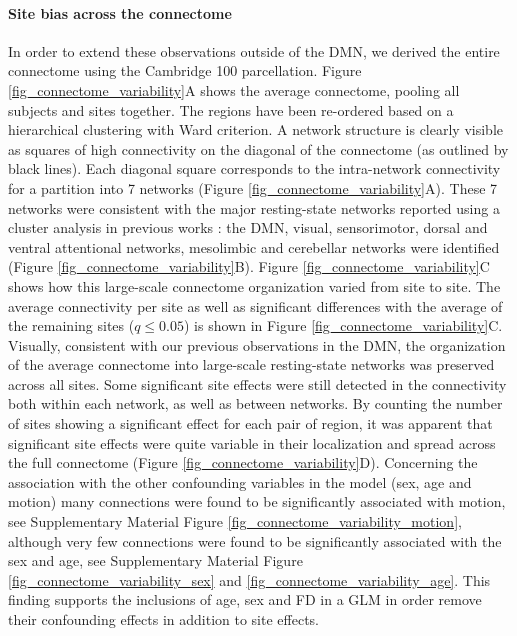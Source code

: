 \documentclass[authoryear]{elsarticle}
\begin{document}
\paragraph{Site bias across the connectome} In order to extend these
observations outside of the DMN, we derived the entire connectome using the
Cambridge 100 parcellation. Figure \ref{fig_connectome_variability}A shows the
average connectome, pooling all subjects and sites together. The regions have
been re-ordered based on a hierarchical clustering with Ward criterion. A
network structure is clearly visible as squares of high connectivity on the
diagonal of the connectome (as outlined by black lines). Each diagonal square
corresponds to the intra-network connectivity for a partition into 7 networks (Figure \ref{fig_connectome_variability}A). These 7 networks were
consistent with the major resting-state networks reported using a cluster
analysis in previous works \citep[e.g.][]{Heuvel2008, Bellec2010, Yeo2011,
Power2011}: the DMN, visual, sensorimotor, dorsal and ventral attentional
networks, mesolimbic and cerebellar networks were
identified (Figure \ref{fig_connectome_variability}B). Figure \ref{fig_connectome_variability}C shows how this large-scale
connectome organization varied from site to site. The average connectivity per
site as well as significant differences with the average of the remaining sites
($q\leq 0.05$) is shown in Figure \ref{fig_connectome_variability}C.
Visually, consistent with our previous observations in the DMN, the organization
of the average connectome into large-scale resting-state networks was preserved
across all sites. 
Some significant site effects were still detected in the connectivity both within each network, as well as between networks. By counting the number of sites showing a significant effect for each pair of region, it was apparent that significant site effects were quite variable in their localization and spread across the full connectome (Figure \ref{fig_connectome_variability}D). 
Concerning the association with the other confounding variables in the model (sex, age and motion) many connections were found to be significantly associated with motion, see Supplementary Material Figure \ref{fig_connectome_variability_motion}, although very few connections were found to be significantly associated with the sex and age, see Supplementary Material Figure \ref{fig_connectome_variability_sex} and \ref{fig_connectome_variability_age}. This finding supports the inclusions of age, sex and FD in a GLM in order remove their confounding effects in addition to site effects.
\end{document}
